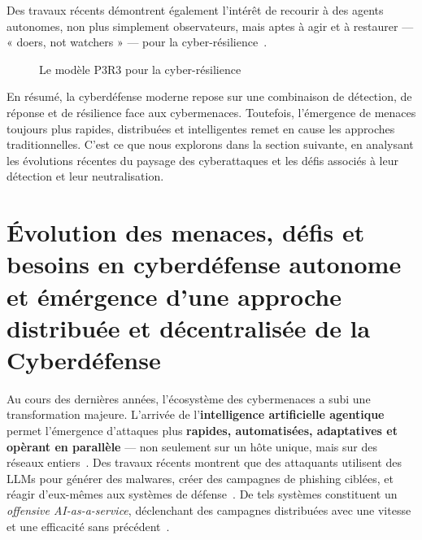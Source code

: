 \documentclass[ twoside,openright,titlepage,numbers=noenddot,headinclude,%
                footinclude=true,cleardoublepage=empty,abstractoff, %
                BCOR=5mm,paper=a4,fontsize=11pt,%
                french,american,%
                ]{scrreprt}
\begin{document}
Des travaux récents démontrent également l’intérêt de recourir à des agents autonomes, non plus simplement observateurs, mais aptes à agir et à restaurer — « doers, not watchers » — pour la cyber-résilience~\cite{Kott2020doers}.

\begin{figure}[h]
  \centering
  \caption{Le modèle P3R3 pour la cyber-résilience}
  \label{fig:P3R3_model}
\end{figure}

\noindent
En résumé, la cyberdéfense moderne repose sur une combinaison de détection, de réponse et de résilience face aux cybermenaces. Toutefois, l’émergence de menaces toujours plus rapides, distribuées et intelligentes remet en cause les approches traditionnelles. C’est ce que nous explorons dans la section suivante, en analysant les évolutions récentes du paysage des cyberattaques et les défis associés à leur détection et leur neutralisation.


\section{Évolution des menaces, défis et besoins en cyberdéfense autonome et émérgence d'une approche distribuée et décentralisée de la Cyberdéfense}\label{sec:evolution-menaces}


Au cours des dernières années, l’écosystème des cybermenaces a subi une transformation majeure. L’arrivée de l’\textbf{intelligence artificielle agentique} permet l’émergence d’attaques plus \textbf{rapides, automatisées, adaptatives et opèrant en parallèle} — non seulement sur un hôte unique, mais sur des réseaux entiers~\cite{Tarraf2021}. Des travaux récents montrent que des attaquants utilisent des LLMs pour générer des malwares, créer des campagnes de phishing ciblées, et réagir d’eux-mêmes aux systèmes de défense~\cite{AutoAttacker2024}. De tels systèmes constituent un {\em offensive AI-as-a-service}, déclenchant des campagnes distribuées avec une vitesse et une efficacité sans précédent~\cite{AgenticAIThreats2025}.
\end{document}
